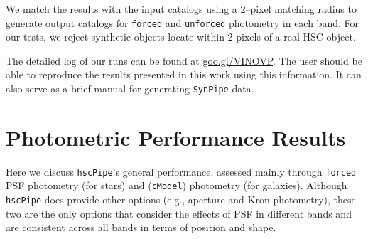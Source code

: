 \documentclass[useamsfonts]{pasj01}
\def\hscpipe{\texttt{hscPipe}}
\def\synpipe{\texttt{SynPipe}}
\def\cmodel{\texttt{cModel}}
\def\forced{\texttt{forced}}
\def\unforced{\texttt{unforced}}
\begin{document}
    We match the results with the input catalogs using a 2--pixel matching radius
    to generate output catalogs for \forced{} and \unforced{} photometry
    in each band. For our tests, we reject  synthetic objects  locate within 2 pixels of a real HSC object. 
    
    The detailed log of our runs can be found at \url{goo.gl/VINOVP}.
    The user should be able to reproduce the results presented in this work using 
    this information. It can also serve as a brief manual for generating \synpipe{} data.


\section{Photometric Performance Results}
    \label{sec:result}

    Here we discuss \hscpipe{}'s general performance, assessed mainly through \forced{} 
    PSF photometry (for stars) and (\cmodel{}) photometry (for galaxies).
    Although \hscpipe{} does provide other options (e.g., aperture and Kron photometry),
    these two are the only options that consider the effects of PSF in different bands 
    and are consistent across all bands in terms of position and shape. 
    
\end{document}
